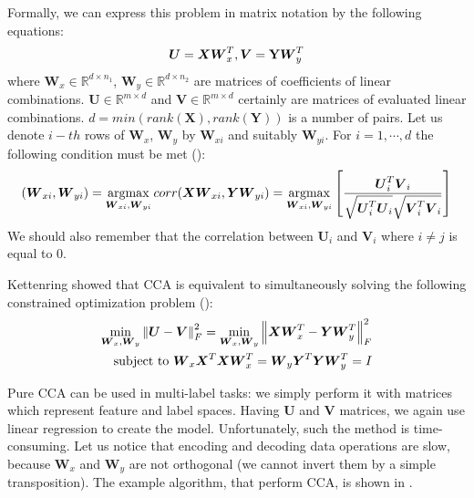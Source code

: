 Formally, we can express this problem in matrix notation by the following equations:
\begin{equation}\label{eq:cca1}
    \boldsymbol{U}=\boldsymbol{X}\boldsymbol{W}_x^T,   \boldsymbol{V}=\bold{Y}\boldsymbol{W}_y^T    
\end{equation}
where $\boldsymbol{W}_x \in \mathbb{R}^{d \times n_1}$, $\boldsymbol{W}_y \in \mathbb{R}^{d \times n_2}$ are matrices of coefficients of linear combinations. $\boldsymbol{U} \in \mathbb{R}^{m \times d}$ and $\boldsymbol{V} \in \mathbb{R}^{m \times d}$ certainly are matrices of evaluated linear combinations. $d=min(rank(\boldsymbol{X}), rank(\boldsymbol{Y}))$ is a number of pairs. Let us denote $i-th$ rows of $\boldsymbol{W}_x$, $\boldsymbol{W}_y$ by $\boldsymbol{W}_{xi}$ and suitably $\boldsymbol{W}_{yi}$. For $i=1,\cdots,d$ the following condition must be met (\cite{William}):
\begin{equation}\label{eq:cca2}
    (\boldsymbol{W}_{xi}, \boldsymbol{W}_{yi})=\operatorname*{argmax}_{\boldsymbol{W}_{xi}, \boldsymbol{W}_{yi}} corr(\boldsymbol{X}\boldsymbol{W}_{xi}, \boldsymbol{Y}\boldsymbol{W}_{yi}) = \operatorname*{argmax}_{\boldsymbol{W}_{xi}, \boldsymbol{W}_{yi}} \left[\frac{\boldsymbol{U}^{T}_i\boldsymbol{V}_i}{\sqrt{\boldsymbol{U}^T_i\boldsymbol{U}_i}\sqrt{\boldsymbol{V}^{T}_i\boldsymbol{V}_i}}\right] 
\end{equation}
We should also remember that the correlation between $\boldsymbol{U}_i$ and $\boldsymbol{V}_i$ where $i\neq j$ is equal to $0$.

Kettenring showed that CCA is equivalent to simultaneously solving the following constrained optimization problem (\cite{ChenLin}):
\begin{equation}\label{eq:cca3}
\begin{split}
    \min_{\boldsymbol{W}_x, \boldsymbol{W}_y} \left\lVert\boldsymbol{U}-\boldsymbol{V}\right\rVert_{F}^2 = \min_{\boldsymbol{W}_x, \boldsymbol{W}_y} \left\lVert\boldsymbol{X}\boldsymbol{W}_x^T-\boldsymbol{Y}\boldsymbol{W}_y^T\right\rVert_{F}^2 \\ 
    \text{   subject to   } \boldsymbol{W}_x\boldsymbol{X}^T\boldsymbol{X}\boldsymbol{W}_x^T=\boldsymbol{W}_y\boldsymbol{Y}^T\boldsymbol{Y}\boldsymbol{W}_y^T=I   
\end{split}
\end{equation}

Pure CCA can be used in multi-label tasks: we simply perform it with matrices which represent feature and label spaces. Having $\boldsymbol{U}$ and $\boldsymbol{V}$ matrices, we again use linear regression to create the model. Unfortunately, such the method is time-consuming. Let us notice that encoding and decoding data operations are slow, because $\boldsymbol{W}_x$ and $\boldsymbol{W}_y$ are not orthogonal (we cannot invert them by a simple transposition). The example algorithm, that perform CCA, is shown in . 

